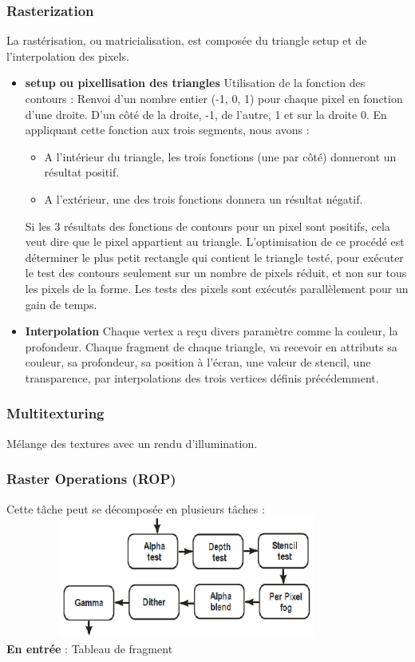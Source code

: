 \subsubsection{Rasterization}
La rastérisation, ou matricialisation, est composée du triangle setup et de l’interpolation des pixels.
\begin{itemize}
  \item{\textbf{setup ou pixellisation des triangles}} 
Utilisation de la fonction des contours : Renvoi d’un nombre entier (-1, 0, 1) pour chaque pixel en fonction d’une droite. D’un côté de la droite, -1, de l’autre, 1 et sur la droite 0.
En appliquant cette fonction aux trois segments, nous avons :
\begin{itemize}
	\item A l'intérieur du triangle, les trois fonctions (une par côté) donneront un résultat positif.
	\item A l'extérieur, une des trois fonctions donnera un résultat négatif.
\end{itemize}
Si les 3 résultats des fonctions de contours pour un pixel sont positifs, cela veut dire que le pixel appartient au triangle.
L’optimisation de ce procédé est déterminer le plus petit rectangle qui contient le triangle testé, pour exécuter le test des contours seulement sur un nombre de pixels réduit, et non sur tous les pixels de la forme.
Les tests des pixels sont exécutés parallèlement pour un gain de temps.
\item{\textbf{Interpolation}}
Chaque vertex a reçu divers paramètre comme la couleur, la profondeur. Chaque fragment  de chaque triangle, va recevoir en attributs sa couleur, sa profondeur, sa position à l’écran, une valeur de stencil, une transparence, par interpolations des trois vertices définis précédemment.
\end{itemize}
\subsubsection{Multitexturing}
Mélange des textures avec un rendu d’illumination.

\subsubsection{Raster Operations (ROP)}
Cette tâche peut se décomposée en plusieurs tâches :
\\
\includegraphics[width=12cm,height=40mm]{leo/images/rasterOp.png}
\\
\textbf{En entrée} : Tableau de fragment

